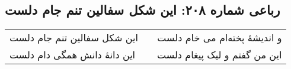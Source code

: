 \begin{center}
\section*{رباعی شماره ۲۰۸: این شکل سفالین تنم جام دلست}
\label{sec:0208}
\begin{longtable}{l p{0.5cm} r}
این شکل سفالین تنم جام دلست
&&
و اندیشهٔ پخته‌ام می خام دلست
\\
این دانهٔ دانش همگی دام دلست
&&
این من گفتم و لیک پیغام دلست
\\
\end{longtable}
\end{center}
